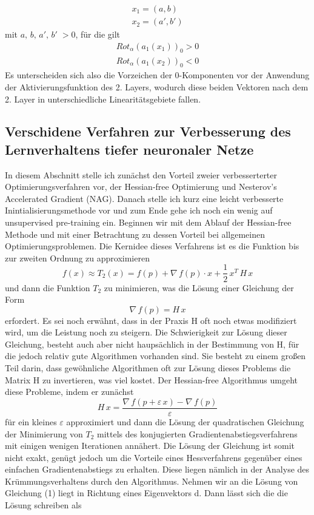\documentclass[12pt]{article}
\begin{document}
\begin{align*}
    x_1=(a,b)\\
    x_2=(a',b')
\end{align*}
mit $a,\,b,\,a',\,b'\;>0$, für die gilt
\begin{align*}
    Rot_\alpha(a_1(x_1))_0>0\\
    Rot_\alpha(a_1(x_2))_0<0
\end{align*}
Es unterscheiden sich also die Vorzeichen der 0-Komponenten vor der Anwendung der Aktivierungsfunktion des 2. Layers, wodurch diese beiden Vektoren nach dem 2. Layer in unterschiedliche Linearitätsgebiete fallen.

\subsection*{Verschidene Verfahren zur Verbesserung des Lernverhaltens tiefer neuronaler Netze}
In diesem Abschnitt stelle ich zunächst den Vorteil zweier verbesserterter Optimierungsverfahren vor, der Hessian-free Optimierung und Nesterov's Accelerated Gradient (NAG). Danach stelle ich kurz eine leicht verbesserte Inintialisierungsmethode vor und zum Ende gehe ich noch ein wenig auf unsupervised pre-training ein.\newline
Beginnen wir mit dem Ablauf der Hessian-free Methode und mit einer Betrachtung zu dessen Vorteil bei allgemeinen Optimierungsproblemen. Die Kernidee dieses Verfahrens ist es die Funktion bis zur zweiten Ordnung zu approximieren
$$f(x)\approx{T_2}(x)=f(p)+\nabla\,f(p)\cdot{x}+\frac{1}{2}\,x^T\,H\,x$$
und dann die Funktion $T_2$ zu minimieren, was die Lösung einer Gleichung der Form
$$\nabla\,f(p)=H\,x$$
erfordert. Es sei noch erwähnt, dass in der Praxis H oft noch etwas modifiziert wird, um die Leistung noch zu steigern. Die Schwierigkeit zur Lösung dieser Gleichung, besteht auch aber nicht haupsächlich in der Bestimmung von H, für die jedoch relativ gute Algorithmen vorhanden sind. Sie besteht zu einem großen Teil darin, dass gewöhnliche Algorithmen oft zur Lösung dieses Problems die Matrix H zu invertieren, was viel kostet. Der Hessian-free Algorithmus umgeht diese Probleme, indem er zunächst 
\begin{equation}H\,x=\frac{\nabla\,f(p+\varepsilon\,x)-\nabla\,f(p)}{\varepsilon}\end{equation}
für ein kleines $\varepsilon$ approximiert und dann die Lösung der quadratischen Gleichung der Minimierung von $T_2$ mittels des konjugierten Gradientenabstiegsverfahrens mit einigen wenigen Iterationen annähert. Die Lösung der Gleichung ist somit nicht exakt, genügt jedoch um die Vorteile eines Hessverfahrens gegenüber eines einfachen Gradientenabstiegs zu erhalten. Diese liegen nämlich in der Analyse des Krümmungsverhaltens durch den Algorithmus. Nehmen wir an die Lösung von Gleichung (1) liegt in Richtung eines Eigenvektors d. Dann lässt sich die die Lösung schreiben als
\end{document}
